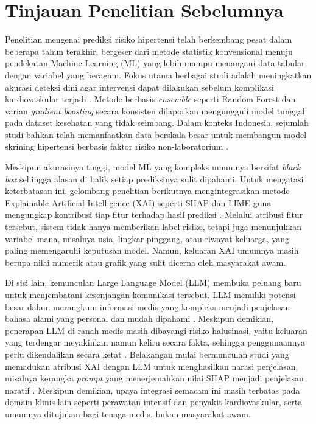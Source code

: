 \section{Tinjauan Penelitian Sebelumnya}
Penelitian mengenai prediksi risiko hipertensi telah berkembang pesat dalam beberapa tahun terakhir, bergeser dari metode statistik konvensional menuju pendekatan Machine Learning (ML) yang lebih mampu menangani data tabular dengan variabel yang beragam. Fokus utama berbagai studi adalah meningkatkan akurasi deteksi dini agar intervensi dapat dilakukan sebelum komplikasi kardiovaskular terjadi \autocite{Silva2022MLHypertension}. Metode berbasis \emph{ensemble} seperti Random Forest dan varian \emph{gradient boosting} secara konsisten dilaporkan mengungguli model tunggal pada dataset kesehatan yang tidak seimbang. Dalam konteks Indonesia, sejumlah studi bahkan telah memanfaatkan data berskala besar untuk membangun model skrining hipertensi berbasis faktor risiko non-laboratorium \autocite{Estiko2025, Septian2025Prediction}.

Meskipun akurasinya tinggi, model ML yang kompleks umumnya bersifat \emph{black box} sehingga alasan di balik setiap prediksinya sulit dipahami. Untuk mengatasi keterbatasan ini, gelombang penelitian berikutnya mengintegrasikan metode Explainable Artificial Intelligence (XAI) seperti SHAP dan LIME guna mengungkap kontribusi tiap fitur terhadap hasil prediksi \autocite{Adadi2018}. Melalui atribusi fitur tersebut, sistem tidak hanya memberikan label risiko, tetapi juga menunjukkan variabel mana, misalnya usia, lingkar pinggang, atau riwayat keluarga, yang paling memengaruhi keputusan model. Namun, keluaran XAI umumnya masih berupa nilai numerik atau grafik yang sulit dicerna oleh masyarakat awam.

Di sisi lain, kemunculan Large Language Model (LLM) membuka peluang baru untuk menjembatani kesenjangan komunikasi tersebut. LLM memiliki potensi besar dalam merangkum informasi medis yang kompleks menjadi penjelasan bahasa alami yang personal dan mudah dipahami \autocite{Thirunavukarasu2023Large}. Meskipun demikian, penerapan LLM di ranah medis masih dibayangi risiko halusinasi, yaitu keluaran yang terdengar meyakinkan namun keliru secara fakta, sehingga penggunaannya perlu dikendalikan secara ketat \autocite{Clusmann2023Future}. Belakangan mulai bermunculan studi yang memadukan atribusi XAI dengan LLM untuk menghasilkan narasi penjelasan, misalnya kerangka \emph{prompt} yang menerjemahkan nilai SHAP menjadi penjelasan naratif \autocite{Lee2025Prompt}. Meskipun demikian, upaya integrasi semacam ini masih terbatas pada domain klinis lain seperti perawatan intensif dan penyakit kardiovaskular, serta umumnya ditujukan bagi tenaga medis, bukan masyarakat awam.


